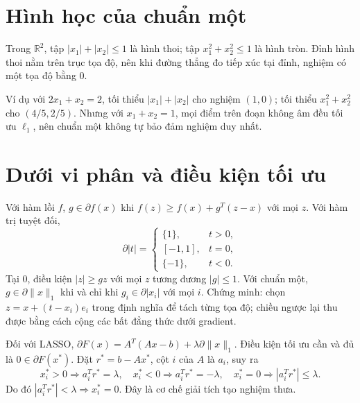 \documentclass[12pt,a4paper]{article}
\newcommand{\R}{\mathbb R}\newcommand{\supp}{\operatorname{supp}}\newcommand{\spark}{\operatorname{spark}}
\begin{document}
\section{Hình học của chuẩn một}
Trong $\R^2$, tập $|x_1|+|x_2|\le1$ là hình thoi; tập $x_1^2+x_2^2\le1$ là hình tròn. Đỉnh hình thoi nằm trên trục tọa độ, nên khi đường thẳng đo tiếp xúc tại đỉnh, nghiệm có một tọa độ bằng 0.
\begin{center}\end{center}

Ví dụ với $2x_1+x_2=2$, tối thiểu $|x_1|+|x_2|$ cho nghiệm $(1,0)$; tối thiểu $x_1^2+x_2^2$ cho $(4/5,2/5)$. Nhưng với $x_1+x_2=1$, mọi điểm trên đoạn không âm đều tối ưu $\ell_1$, nên chuẩn một không tự bảo đảm nghiệm duy nhất.
\clearpage
\section{Dưới vi phân và điều kiện tối ưu}
Với hàm lồi $f$, $g\in\partial f(x)$ khi $f(z)\ge f(x)+g^T(z-x)$ với mọi $z$. Với hàm trị tuyệt đối,
\[\partial|t|=\begin{cases}\{1\},&t>0,\\[-0.5ex] [-1,1],&t=0,\\\{-1\},&t<0.\end{cases}\]
Tại $0$, điều kiện $|z|\ge gz$ với mọi $z$ tương đương $|g|\le1$. Với chuẩn một, $g\in\partial\|x\|_1$ khi và chỉ khi $g_i\in\partial|x_i|$ với mọi $i$. Chứng minh: chọn $z=x+(t-x_i)e_i$ trong định nghĩa để tách từng tọa độ; chiều ngược lại thu được bằng cách cộng các bất đẳng thức dưới gradient.

Đối với LASSO, $\partial F(x)=A^T(Ax-b)+\lambda\partial\|x\|_1$. Điều kiện tối ưu cần và đủ là $0\in\partial F(x^*)$. Đặt $r^*=b-Ax^*$, cột $i$ của $A$ là $a_i$, suy ra
\[x_i^*>0\Rightarrow a_i^Tr^*=\lambda,\quad x_i^*<0\Rightarrow a_i^Tr^*=-\lambda,\quad x_i^*=0\Rightarrow |a_i^Tr^*|\le\lambda.\]
Do đó $|a_i^Tr^*|<\lambda\Rightarrow x_i^*=0$. Đây là cơ chế giải tích tạo nghiệm thưa.
\clearpage
\end{document}
